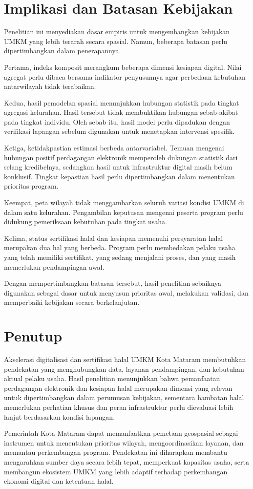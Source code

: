 \documentclass[
  indonesian,
  11pt,
  a4paper,
]{report}
\begin{document}
\chapter*{Implikasi dan Batasan
Kebijakan}\label{implikasi-dan-batasan-kebijakan}

Penelitian ini menyediakan dasar empiris untuk mengembangkan kebijakan
UMKM yang lebih terarah secara spasial. Namun, beberapa batasan perlu
dipertimbangkan dalam penerapannya.

Pertama, indeks komposit merangkum beberapa dimensi kesiapan digital.
Nilai agregat perlu dibaca bersama indikator penyusunnya agar perbedaan
kebutuhan antarwilayah tidak terabaikan.

Kedua, hasil pemodelan spasial menunjukkan hubungan statistik pada
tingkat agregasi kelurahan. Hasil tersebut tidak membuktikan hubungan
sebab-akibat pada tingkat individu. Oleh sebab itu, hasil model perlu
dipadukan dengan verifikasi lapangan sebelum digunakan untuk menetapkan
intervensi spesifik.

Ketiga, ketidakpastian estimasi berbeda antarvariabel. Temuan mengenai
hubungan positif perdagangan elektronik memperoleh dukungan statistik
dari selang kredibelnya, sedangkan hasil untuk infrastruktur digital
masih belum konklusif. Tingkat kepastian hasil perlu dipertimbangkan
dalam menentukan prioritas program.

Keempat, peta wilayah tidak menggambarkan seluruh variasi kondisi UMKM
di dalam satu kelurahan. Pengambilan keputusan mengenai peserta program
perlu didukung pemeriksaan kebutuhan pada tingkat usaha.

Kelima, status sertifikasi halal dan kesiapan memenuhi persyaratan halal
merupakan dua hal yang berbeda. Program perlu membedakan pelaku usaha
yang telah memiliki sertifikat, yang sedang menjalani proses, dan yang
masih memerlukan pendampingan awal.

Dengan mempertimbangkan batasan tersebut, hasil penelitian sebaiknya
digunakan sebagai dasar untuk menyusun prioritas awal, melakukan
validasi, dan memperbaiki kebijakan secara berkelanjutan.

\chapter*{Penutup}\label{penutup}

Akselerasi digitalisasi dan sertifikasi halal UMKM Kota Mataram
membutuhkan pendekatan yang menghubungkan data, layanan pendampingan,
dan kebutuhan aktual pelaku usaha. Hasil penelitian menunjukkan bahwa
pemanfaatan perdagangan elektronik dan kesiapan halal merupakan dimensi
yang relevan untuk dipertimbangkan dalam perumusan kebijakan, sementara
hambatan halal memerlukan perhatian khusus dan peran infrastruktur perlu
dievaluasi lebih lanjut berdasarkan kondisi lapangan.

Pemerintah Kota Mataram dapat memanfaatkan pemetaan geospasial sebagai
instrumen untuk menentukan prioritas wilayah, mengoordinasikan layanan,
dan memantau perkembangan program. Pendekatan ini diharapkan membantu
mengarahkan sumber daya secara lebih tepat, memperkuat kapasitas usaha,
serta membangun ekosistem UMKM yang lebih adaptif terhadap perkembangan
ekonomi digital dan ketentuan halal.
\end{document}

